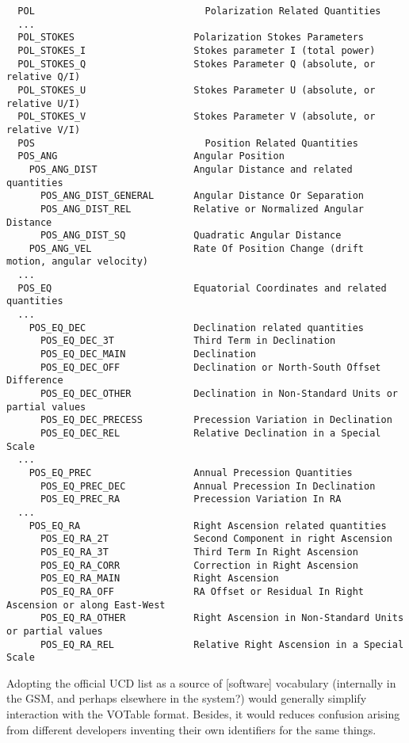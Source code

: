 \documentclass[]{lofar}
\begin{document}
  {\small\begin{verbatim}
  POL                              Polarization Related Quantities
  ...
  POL_STOKES                     Polarization Stokes Parameters
  POL_STOKES_I                   Stokes parameter I (total power)
  POL_STOKES_Q                   Stokes Parameter Q (absolute, or relative Q/I) 
  POL_STOKES_U                   Stokes Parameter U (absolute, or relative U/I) 
  POL_STOKES_V                   Stokes Parameter V (absolute, or relative V/I) 
  POS                              Position Related Quantities
  POS_ANG                        Angular Position
    POS_ANG_DIST                 Angular Distance and related quantities
      POS_ANG_DIST_GENERAL       Angular Distance Or Separation
      POS_ANG_DIST_REL           Relative or Normalized Angular Distance
      POS_ANG_DIST_SQ            Quadratic Angular Distance
    POS_ANG_VEL                  Rate Of Position Change (drift motion, angular velocity)
  ...
  POS_EQ                         Equatorial Coordinates and related quantities
  ...
    POS_EQ_DEC                   Declination related quantities
      POS_EQ_DEC_3T              Third Term in Declination
      POS_EQ_DEC_MAIN            Declination
      POS_EQ_DEC_OFF             Declination or North-South Offset Difference
      POS_EQ_DEC_OTHER           Declination in Non-Standard Units or partial values
      POS_EQ_DEC_PRECESS         Precession Variation in Declination
      POS_EQ_DEC_REL             Relative Declination in a Special Scale
  ...
    POS_EQ_PREC                  Annual Precession Quantities
      POS_EQ_PREC_DEC            Annual Precession In Declination
      POS_EQ_PREC_RA             Precession Variation In RA
  ...
    POS_EQ_RA                    Right Ascension related quantities
      POS_EQ_RA_2T               Second Component in right Ascension
      POS_EQ_RA_3T               Third Term In Right Ascension
      POS_EQ_RA_CORR             Correction in Right Ascension
      POS_EQ_RA_MAIN             Right Ascension
      POS_EQ_RA_OFF              RA Offset or Residual In Right Ascension or along East-West
      POS_EQ_RA_OTHER            Right Ascension in Non-Standard Units or partial values
      POS_EQ_RA_REL              Relative Right Ascension in a Special Scale
  \end{verbatim}}
  
  Adopting the official UCD list as a source of [software] vocabulary (internally
  in the GSM, and perhaps elsewhere in the system?) would generally simplify
  interaction with the VOTable format. Besides, it would reduces confusion 
  arising from different developers inventing their own identifiers for the same
  things.
  
\end{document}
